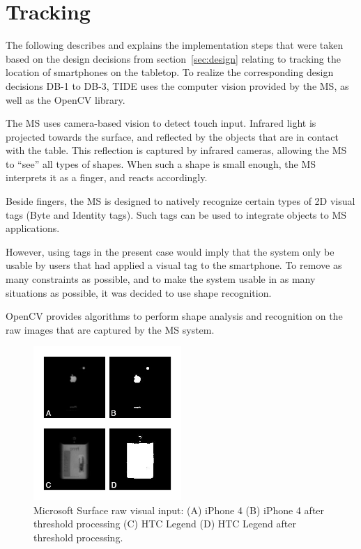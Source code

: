 \section{Tracking}
\label{sec:tracking}

The following describes and explains the implementation steps that were taken based on the design decisions from section~\ref{sec:design} relating to tracking the location of smartphones on the tabletop.
To realize the corresponding design decisions DB-1 to DB-3, TIDE uses the computer vision provided by the MS, as well as the OpenCV library.

The MS uses camera-based vision to detect touch input.
Infrared light is projected towards the surface, and reflected by the objects that are in contact with the table.
This reflection is captured by infrared cameras, allowing the MS to ``see'' all types of shapes.
When such a shape is small enough, the MS interprets it as a finger, and reacts accordingly.

Beside fingers, the MS is designed to natively recognize certain types of 2D visual tags (Byte and Identity tags).
Such tags can be used to integrate objects to MS applications.

However, using tags in the present case would imply that the system only be usable by users that had applied a visual tag to the smartphone.
To remove as many constraints as possible, and to make the system usable in as many situations as possible, it was decided to use shape recognition.

OpenCV provides algorithms to perform shape analysis and recognition on the raw images that are captured by the MS system. 


\begin{figure}[htbp]
  \centering
    \includegraphics[width=0.5\textwidth]{images/msRaw}
    \caption{Microsoft Surface raw visual input: (A) iPhone 4 (B) iPhone 4 after threshold processing (C) HTC Legend (D) HTC Legend after threshold processing.}
    \label{fig:msRaw}
\end{figure}

